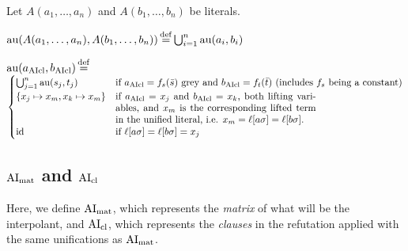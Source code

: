 \documentclass[,%
	paper=a4,%
	DIV14, %
	twoside=false,%
	liststotoc,
	bibtotoc,
	draft=false,%
	numbers=noendperiod
]{scrartcl}
\begin{document}
Let $A(a_1, \dotsc, a_n)$ and $A(b_1, \dotsc, b_n)$ be literals.

$\operatorname{au}(A(a_1, \dotsc, a_n), A(b_1, \dotsc, b_n)) \operatorname{\stackrel{\mathrm{def}}{=}} \bigcup_{i=1}^n \operatorname{au}(a_i, b_i)$

$ \aiu (a\fromclause, b\fromclause) \defeq$\newline
$
\begin{cases}
	\bigcup_{j=1}^n \aiu(s_j, t_j) & \text{if $a\cl=f_s(\bar s)$ grey and $b\cl = f_t(\bar t)$ (includes $f_s$ being a constant)} \\
	\{x_j \mapsto x_m, x_k \mapsto x_m\} & \parbox[t]{.6\textwidth}{if $a\cl = x_j$ and $b\cl = x_k$, both lifting variables, and $x_m$ is the corresponding lifted term in the unified literal, i.e. $x_m = \lifboth{a\sigma} = \lifboth{b\sigma}$.
	{\tiny


}}\\
\id & \text{if $\lifboth{a\sigma} = \lifboth{b\sigma} = x_j$ }
\end{cases} $


\subsection{$\operatorname{AI}_\mathrm{mat}$ and $\operatorname{AI}_\mathrm{cl}$}

Here, we define $\operatorname{AI}_\mathrm{mat}$, which represents the \emph{matrix} of what will be the interpolant, and $\operatorname{AI}_\mathrm{cl}$, which represents the \emph{clauses} in the refutation applied with the same unifications as $\operatorname{AI}_\mathrm{mat}$.
\end{document}
